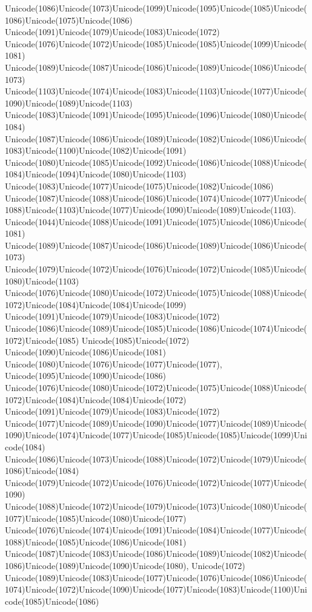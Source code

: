 \documentclass[a4paper,11pt]{report}
\begin{document}
{{Unicode(1086)Unicode(1073)Unicode(1099)Unicode(1095)Unicode(1085)Unicode(1086)Unicode(1075)Unicode(1086)
Unicode(1091)Unicode(1079)Unicode(1083)Unicode(1072)
Unicode(1076)Unicode(1072)Unicode(1085)Unicode(1085)Unicode(1099)Unicode(1081)
Unicode(1089)Unicode(1087)Unicode(1086)Unicode(1089)Unicode(1086)Unicode(1073)
Unicode(1103)Unicode(1074)Unicode(1083)Unicode(1103)Unicode(1077)Unicode(1090)Unicode(1089)Unicode(1103)
Unicode(1083)Unicode(1091)Unicode(1095)Unicode(1096)Unicode(1080)Unicode(1084)
Unicode(1087)Unicode(1086)Unicode(1089)Unicode(1082)Unicode(1086)Unicode(1083)Unicode(1100)Unicode(1082)Unicode(1091)
Unicode(1080)Unicode(1085)Unicode(1092)Unicode(1086)Unicode(1088)Unicode(1084)Unicode(1094)Unicode(1080)Unicode(1103)
Unicode(1083)Unicode(1077)Unicode(1075)Unicode(1082)Unicode(1086)
Unicode(1087)Unicode(1088)Unicode(1086)Unicode(1074)Unicode(1077)Unicode(1088)Unicode(1103)Unicode(1077)Unicode(1090)Unicode(1089)Unicode(1103).
Unicode(1044)Unicode(1088)Unicode(1091)Unicode(1075)Unicode(1086)Unicode(1081)
Unicode(1089)Unicode(1087)Unicode(1086)Unicode(1089)Unicode(1086)Unicode(1073)
Unicode(1079)Unicode(1072)Unicode(1076)Unicode(1072)Unicode(1085)Unicode(1080)Unicode(1103)
Unicode(1076)Unicode(1080)Unicode(1072)Unicode(1075)Unicode(1088)Unicode(1072)Unicode(1084)Unicode(1084)Unicode(1099)
Unicode(1091)Unicode(1079)Unicode(1083)Unicode(1072)
Unicode(1086)Unicode(1089)Unicode(1085)Unicode(1086)Unicode(1074)Unicode(1072)Unicode(1085)
Unicode(1085)Unicode(1072) Unicode(1090)Unicode(1086)Unicode(1081)
Unicode(1080)Unicode(1076)Unicode(1077)Unicode(1077),
Unicode(1095)Unicode(1090)Unicode(1086)
Unicode(1076)Unicode(1080)Unicode(1072)Unicode(1075)Unicode(1088)Unicode(1072)Unicode(1084)Unicode(1084)Unicode(1072)
Unicode(1091)Unicode(1079)Unicode(1083)Unicode(1072)
Unicode(1077)Unicode(1089)Unicode(1090)Unicode(1077)Unicode(1089)Unicode(1090)Unicode(1074)Unicode(1077)Unicode(1085)Unicode(1085)Unicode(1099)Unicode(1084)
Unicode(1086)Unicode(1073)Unicode(1088)Unicode(1072)Unicode(1079)Unicode(1086)Unicode(1084)
Unicode(1079)Unicode(1072)Unicode(1076)Unicode(1072)Unicode(1077)Unicode(1090)
Unicode(1088)Unicode(1072)Unicode(1079)Unicode(1073)Unicode(1080)Unicode(1077)Unicode(1085)Unicode(1080)Unicode(1077)
Unicode(1076)Unicode(1074)Unicode(1091)Unicode(1084)Unicode(1077)Unicode(1088)Unicode(1085)Unicode(1086)Unicode(1081)
Unicode(1087)Unicode(1083)Unicode(1086)Unicode(1089)Unicode(1082)Unicode(1086)Unicode(1089)Unicode(1090)Unicode(1080),
Unicode(1072)
Unicode(1089)Unicode(1083)Unicode(1077)Unicode(1076)Unicode(1086)Unicode(1074)Unicode(1072)Unicode(1090)Unicode(1077)Unicode(1083)Unicode(1100)Unicode(1085)Unicode(1086)
}}
\end{document}
